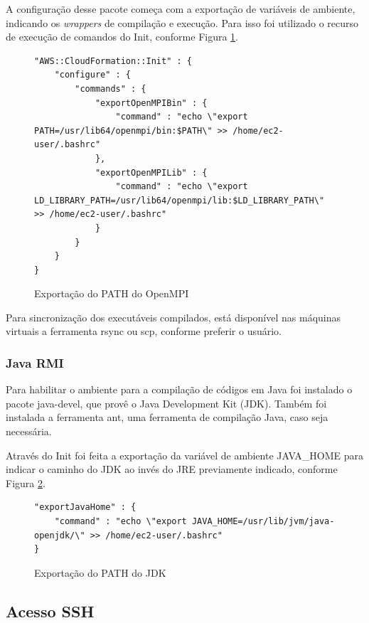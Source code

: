\documentclass[tg]{mdtufsm}
\begin{document}
A configuração desse pacote começa com a exportação de variáveis de ambiente, indicando os \emph{wrappers} de compilação e execução. Para isso foi utilizado o recurso de execução de comandos do Init, conforme Figura \ref{openMPI}.

\begin{figure}
\centering
\begin{lstlisting}[frame=single, numbers=none]
"AWS::CloudFormation::Init" : {
	"configure" : {
		"commands" : {
			"exportOpenMPIBin" : {
				"command" : "echo \"export PATH=/usr/lib64/openmpi/bin:$PATH\" >> /home/ec2-user/.bashrc"
			},
			"exportOpenMPILib" : {
				"command" : "echo \"export LD_LIBRARY_PATH=/usr/lib64/openmpi/lib:$LD_LIBRARY_PATH\" >> /home/ec2-user/.bashrc"
			}
		}
	}
}
\end{lstlisting}
\caption{Exportação do PATH do OpenMPI}
\label{openMPI}
\end{figure}

Para sincronização dos executáveis compilados, está disponível nas máquinas virtuais a ferramenta rsync ou scp, conforme preferir o usuário.

\subsubsection{Java RMI}

Para habilitar o ambiente para a compilação de códigos em Java foi instalado o pacote java-devel, que provê o Java Development Kit (JDK). Também foi instalada a ferramenta ant, uma ferramenta de compilação Java, caso seja necessária.

Através do Init foi feita a exportação da variável de ambiente JAVA\_HOME para indicar o caminho do JDK ao invés do JRE previamente indicado, conforme Figura \ref{javaHome}.

\begin{figure}
\centering
\begin{lstlisting}[frame=single, numbers=none]
"exportJavaHome" : {
	"command" : "echo \"export JAVA_HOME=/usr/lib/jvm/java-openjdk/\" >> /home/ec2-user/.bashrc"
}
\end{lstlisting}
\caption{Exportação do PATH do JDK}
\label{javaHome}
\end{figure}

\subsection{Acesso SSH}
\end{document}
